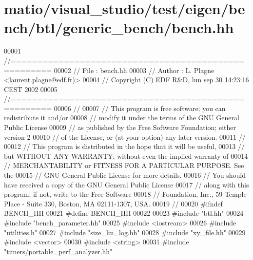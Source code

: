 \hypertarget{matio_2visual__studio_2test_2eigen_2bench_2btl_2generic__bench_2bench_8hh_source}{}\section{matio/visual\+\_\+studio/test/eigen/bench/btl/generic\+\_\+bench/bench.hh}
\label{matio_2visual__studio_2test_2eigen_2bench_2btl_2generic__bench_2bench_8hh_source}

\begin{DoxyCode}
00001 \textcolor{comment}{//=====================================================}
00002 \textcolor{comment}{// File   :  bench.hh}
00003 \textcolor{comment}{// Author :  L. Plagne <laurent.plagne@edf.fr)>}
00004 \textcolor{comment}{// Copyright (C) EDF R&D,  lun sep 30 14:23:16 CEST 2002}
00005 \textcolor{comment}{//=====================================================}
00006 \textcolor{comment}{//}
00007 \textcolor{comment}{// This program is free software; you can redistribute it and/or}
00008 \textcolor{comment}{// modify it under the terms of the GNU General Public License}
00009 \textcolor{comment}{// as published by the Free Software Foundation; either version 2}
00010 \textcolor{comment}{// of the License, or (at your option) any later version.}
00011 \textcolor{comment}{//}
00012 \textcolor{comment}{// This program is distributed in the hope that it will be useful,}
00013 \textcolor{comment}{// but WITHOUT ANY WARRANTY; without even the implied warranty of}
00014 \textcolor{comment}{// MERCHANTABILITY or FITNESS FOR A PARTICULAR PURPOSE.  See the}
00015 \textcolor{comment}{// GNU General Public License for more details.}
00016 \textcolor{comment}{// You should have received a copy of the GNU General Public License}
00017 \textcolor{comment}{// along with this program; if not, write to the Free Software}
00018 \textcolor{comment}{// Foundation, Inc., 59 Temple Place - Suite 330, Boston, MA  02111-1307, USA.}
00019 \textcolor{comment}{//}
00020 \textcolor{preprocessor}{#ifndef BENCH\_HH}
00021 \textcolor{preprocessor}{#define BENCH\_HH}
00022 
00023 \textcolor{preprocessor}{#include "btl.hh"}
00024 \textcolor{preprocessor}{#include "bench\_parameter.hh"}
00025 \textcolor{preprocessor}{#include <iostream>}
00026 \textcolor{preprocessor}{#include "utilities.h"}
00027 \textcolor{preprocessor}{#include "size\_lin\_log.hh"}
00028 \textcolor{preprocessor}{#include "xy\_file.hh"}
00029 \textcolor{preprocessor}{#include <vector>}
00030 \textcolor{preprocessor}{#include <string>}
00031 \textcolor{preprocessor}{#include "timers/portable\_perf\_analyzer.hh"}

\end{DoxyCode}
